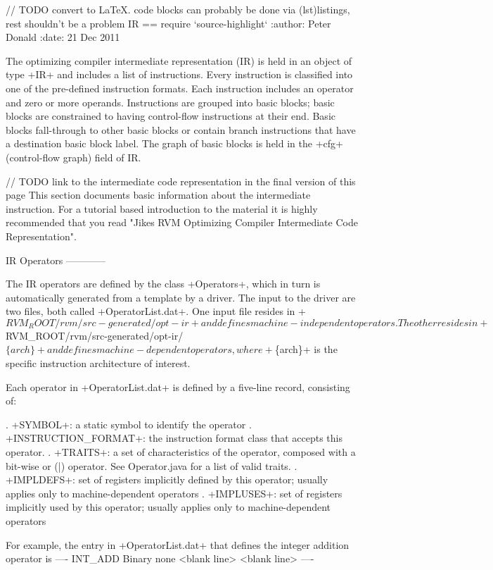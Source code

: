 // TODO convert to LaTeX. code blocks can probably be done via (lst)listings, rest shouldn't be a problem
IR
==
require `source-highlight`
:author: Peter Donald
:date: 21 Dec 2011


The optimizing compiler intermediate representation (IR) is held in an object of type +IR+ and includes a list of instructions. Every instruction is classified into one of the pre-defined instruction formats. Each instruction includes an operator and zero or more operands. Instructions are grouped into basic blocks; basic blocks are constrained to having control-flow instructions at their end. Basic blocks fall-through to other basic blocks or contain branch instructions that have a destination basic block label. The graph of basic blocks is held in the +cfg+ (control-flow graph) field of IR.

// TODO link to the intermediate code representation in the final version of this page
This section documents basic information about the intermediate instruction. For a tutorial based introduction to the material it is highly recommended that you read "Jikes RVM Optimizing Compiler Intermediate Code Representation".

IR Operators
------------

The IR operators are defined by the class +Operators+, which in turn is automatically generated from a template by a driver. The input to the driver are two files, both called +OperatorList.dat+. One input file resides in +$RVM_ROOT/rvm/src-generated/opt-ir+ and defines machine-independent operators. The other resides in +$RVM_ROOT/rvm/src-generated/opt-ir/$\{arch\}+ and defines machine-dependent operators, where +$\{arch\}+ is the specific instruction architecture of interest.

Each operator in +OperatorList.dat+ is defined by a five-line record, consisting of:

. +SYMBOL+: a static symbol to identify the operator
. +INSTRUCTION_FORMAT+: the instruction format class that accepts this operator.
. +TRAITS+: a set of characteristics of the operator, composed with a bit-wise or (|) operator. See Operator.java for a list of valid traits.
. +IMPLDEFS+: set of registers implicitly defined by this operator; usually applies only to machine-dependent operators
. +IMPLUSES+: set of registers implicitly used by this operator; usually applies only to machine-dependent operators

For example, the entry in +OperatorList.dat+ that defines the integer addition operator is
----
INT_ADD
Binary
none
<blank line>
<blank line>
----

